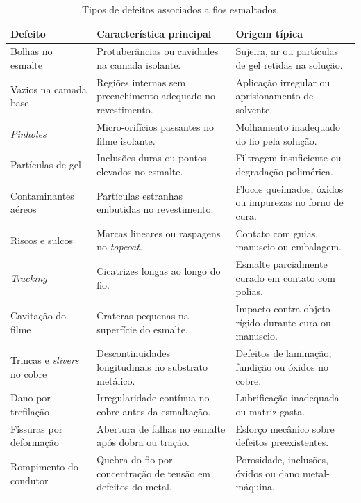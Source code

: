 \begin{table}[htbp]
    \centering
    \footnotesize
    \caption{Tipos de defeitos associados a fios esmaltados.}
    \label{tab:defeitos_fios_esmaltados}
    \begin{tabularx}{\textwidth}{
        >{\raggedright\arraybackslash}p{}
        >{\raggedright\arraybackslash}X
        >{\raggedright\arraybackslash}X
    }
        \toprule
        \textbf{Defeito} & \textbf{Característica principal} & \textbf{Origem típica} \\
        \midrule
        Bolhas no esmalte               & Protuberâncias ou cavidades na camada isolante.                    & Sujeira, ar ou partículas de gel retidas na solução. \\
        Vazios na camada base           & Regiões internas sem preenchimento adequado no revestimento.       & Aplicação irregular ou aprisionamento de solvente. \\
        \emph{Pinholes}                 & Micro-orifícios passantes no filme isolante.                       & Molhamento inadequado do fio pela solução. \\
        Partículas de gel               & Inclusões duras ou pontos elevados no esmalte.                     & Filtragem insuficiente ou degradação polimérica. \\
        Contaminantes aéreos            & Partículas estranhas embutidas no revestimento.                    & Flocos queimados, óxidos ou impurezas no forno de cura. \\
        Riscos e sulcos                 & Marcas lineares ou raspagens no \emph{topcoat}.                    & Contato com guias, manuseio ou embalagem. \\
        \emph{Tracking}                 & Cicatrizes longas ao longo do fio.                                 & Esmalte parcialmente curado em contato com polias. \\
        Cavitação do filme              & Crateras pequenas na superfície do esmalte.                        & Impacto contra objeto rígido durante cura ou manuseio. \\
        Trincas e \emph{slivers} no cobre & Descontinuidades longitudinais no substrato metálico.            & Defeitos de laminação, fundição ou óxidos no cobre. \\
        Dano por trefilação             & Irregularidade contínua no cobre antes da esmaltação.              & Lubrificação inadequada ou matriz gasta. \\
        Fissuras por deformação         & Abertura de falhas no esmalte após dobra ou tração.                & Esforço mecânico sobre defeitos preexistentes. \\
        Rompimento do condutor          & Quebra do fio por concentração de tensão em defeitos do metal.     & Porosidade, inclusões, óxidos ou dano metal-máquina. \\
        \bottomrule
    \end{tabularx}
\end{table}

